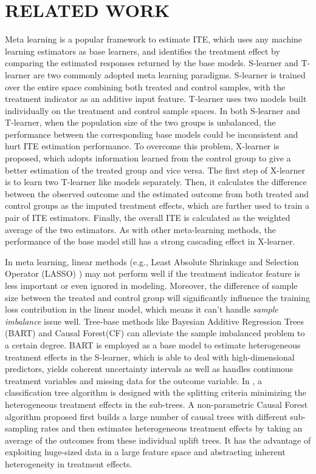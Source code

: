 \documentclass[sigconf]{acmart}
\begin{document}
\section{RELATED WORK}
Meta learning \cite{Zhao2019,Zhao2020,Gutierrez2016} is a popular framework to estimate ITE, which uses any machine learning estimators as base learners, and identifies the treatment effect by comparing the estimated responses returned by the base models. S-learner and T-learner are two commonly adopted meta learning paradigms. S-learner is trained over the entire space combining both treated and control samples, with the treatment indicator as an additive input feature. T-learner uses two models built individually on the treatment and control sample spaces. In both S-learner and T-learner, when the population size of the two groups is unbalanced, the performance between the corresponding base models could be inconsistent and hurt ITE estimation performance. To overcome this problem, X-learner \cite{Kunzel2019} is proposed, which adopts information learned from the control group to give a better estimation of the treated group and vice versa. The first step of X-learner is to learn two T-learner like models separately. Then, it calculates the difference between the observed outcome and the estimated outcome from both treated and control groups as the imputed treatment effects, which are further used to train a pair of ITE estimators. Finally, the overall ITE is calculated as the weighted average of the two estimators. As with other meta-learning methods, the performance of the base model still has a strong cascading effect in X-learner.

In meta learning, linear methods (e.g., Least Absolute Shrinkage and Selection Operator (LASSO) \cite{Tibshirani1996}) may not perform well if the treatment indicator feature is less important or even ignored in modeling. Moreover, the difference of sample size between the treated and control group will significantly influence the training loss contribution in the linear model, which means it can't handle \textit{sample imbalance} issue well. Tree-base methods like Bayesian Additive Regression Trees (BART) \cite{Chipman2010} and Causal Forest(CF) \cite{Wager2018} can alleviate the sample imbalanced problem to a certain degree. BART is employed as a base model to estimate heterogeneous treatment effects in the S-learner, which is able to deal with high-dimensional predictors, yields coherent uncertainty intervals as well as handles continuous treatment variables and missing data for the outcome variable. In \cite{Rzepakowski2012}, a classification tree algorithm is designed with the splitting criteria minimizing the heterogeneous treatment effects in the sub-trees. A non-parametric Causal Forest algorithm proposed first builds a large number of causal trees with different sub-sampling rates and then estimates heterogeneous treatment effects by taking an average of the outcomes from these individual uplift trees. It has the advantage of exploiting huge-sized data in a large feature space and abstracting inherent heterogeneity in treatment effects.
\end{document}
